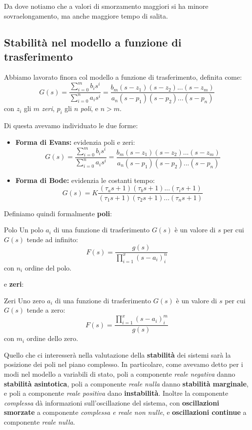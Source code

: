 \documentclass[a4paper,11pt]{article}
\begin{document}
\par\bigskip

Da dove notiamo che a valori di smorzamento maggiori si ha minore sovraelongamento, ma anche maggiore tempo di salita.

\subsection{Stabilità nel modello a funzione di trasferimento}
Abbiamo lavorato finora col modello a funzione di trasferimento, definita come:
$$
G(s) = \frac{\sum_{i = 0}^m b_i s^i}{\sum_{i = 0}^n a_i s^i} = \frac{ b_m (s - z_1) (s - z_2) ... (s - z_m) }{ a_n (s - p_1) (s - p_2) ... (s - p_n) }
$$
con $z_i$ gli $m$ \textit{zeri}, $p_i$ gli $n$ \textit{poli}, e $n > m$.

Di questa avevamo individuato le due forme:
\begin{itemize}
	\item \textbf{Forma di Evans:} evidenzia poli e zeri:
		$$
G(s) = \frac{\sum_{i = 0}^m b_i s^i}{\sum_{i = 0}^n a_i s^i} = \frac{ b_m (s - z_1) (s - z_2) ... (s - z_m) }{ a_n (s - p_1) (s - p_2) ... (s - p_n) }
		$$
	\item \textbf{Forma di Bode:} evidenzia le costanti tempo: 
		$$
G(s) = K \frac{ (\tau_a s + 1) (\tau_b s + 1) ... (\tau_i s + 1) }{ (\tau_1 s + 1) (\tau_2 s + 1) ... (\tau_n s + 1) }
		$$
\end{itemize}

Definiamo quindi formalmente \textbf{poli}:
\begin{definition}{Polo}
	Un polo $a_i$ di una funzione di trasferimento $G(s)$ è un valore di $s$ per cui $G(s)$ tende ad infinito:
	$$
	F(s) = \frac{g(s)}{\prod_{i = 1}^x (s - a_i)^n_i}
	$$
	con $n_i$ ordine del polo.
\end{definition}
e \textbf{zeri}:
\begin{definition}{Zeri}
	Uno zero $a_i$ di una funzione di trasferimento $G(s)$ è un valore di $s$ per cui $G(s)$ tende a zero: 
	$$
	F(s) = \frac{\prod_{i = 1}^x (s - a_i)^m_i}{g(s)}
	$$
	con $m_i$ ordine dello zero.
\end{definition}

Quello che ci interesserà nella valutazione della \textbf{stabilità} dei sistemi sarà la posizione dei poli nel piano complesso.
In particolare, come avevamo detto per i modi nel modello a variabili di stato, poli a componente \textit{reale negativa} danno \textbf{stabilità asintotica}, poli a componente \textit{reale nulla} danno \textbf{stabilità marginale}, e poli a componente \textit{reale positiva} dano \textbf{instabilità}.
Inoltre la componente \textit{complessa} dà informazioni sull'oscillazione del sistema, con \textbf{oscillazioni smorzate} a componente \textit{complessa e reale non nulle}, e \textbf{oscillazioni continue} a componente \textit{reale nulla}.
\end{document}
